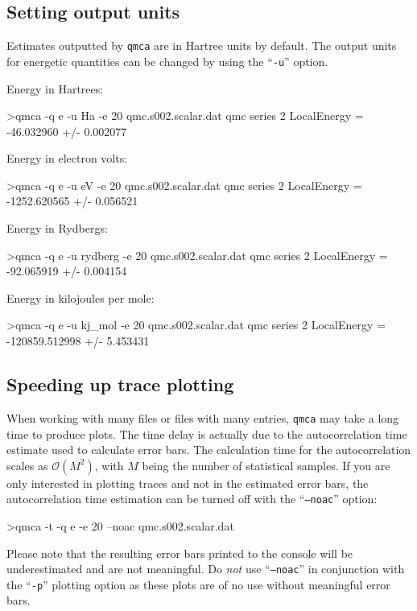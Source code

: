 \subsection{Setting output units}
\label{sec:qmca_output_units}
Estimates outputted by \texttt{qmca} are in Hartree units by 
default.  The output units for energetic quantities can be 
changed by using the ``\texttt{-u}'' option.  

\vspace{3mm}
\noindent
Energy in Hartrees:
\begin{shade}
>qmca -q e -u Ha -e 20 qmc.s002.scalar.dat
qmc  series 2  LocalEnergy           =  -46.032960 +/- 0.002077
\end{shade}

\noindent
Energy in electron volts:
\begin{shade}
>qmca -q e -u eV -e 20 qmc.s002.scalar.dat
qmc  series 2  LocalEnergy           =  -1252.620565 +/- 0.056521 
\end{shade}

\noindent
Energy in Rydbergs:
\begin{shade}
>qmca -q e -u rydberg -e 20 qmc.s002.scalar.dat
qmc  series 2  LocalEnergy           =  -92.065919 +/- 0.004154   
\end{shade}

\noindent
Energy in kilojoules per mole:
\begin{shade}
>qmca -q e -u kj_mol -e 20 qmc.s002.scalar.dat
qmc  series 2  LocalEnergy           =  -120859.512998 +/- 5.453431   
\end{shade}


\subsection{Speeding up trace plotting}
\label{sec:qmca_fast_trace_plot}
When working with many files or files with many entries, 
\texttt{qmca} may take a long time to produce plots.  The time 
delay is actually due to the autocorrelation time estimate 
used to calculate error bars.  The calculation time for 
the autocorrelation scales as $\mathcal{O}(M^2)$, with $M$ being 
the number of statistical samples.  If you are only interested 
in plotting traces and not in the estimated error bars, the 
autocorrelation time estimation can be turned off with the 
``\texttt{--noac}'' option:
\begin{shade}
>qmca -t -q e -e 20 --noac qmc.s002.scalar.dat
\end{shade}
\noindent
Please note that the resulting error bars printed to the console 
will be underestimated and are not meaningful.  Do \emph{not} 
use ``\texttt{--noac}'' in conjunction with the ``\texttt{-p}'' 
plotting option as these plots are of no use without meaningful 
error bars.


